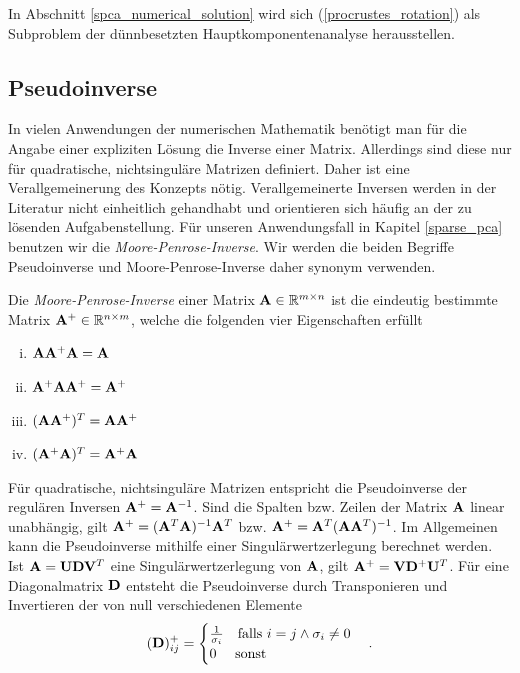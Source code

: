 In Abschnitt \ref{spca_numerical_solution} wird sich (\ref{procrustes_rotation}) als Subproblem der dünnbesetzten Hauptkomponentenanalyse herausstellen.

\subsection{Pseudoinverse}

In vielen Anwendungen der numerischen Mathematik benötigt man für die Angabe einer expliziten Lösung die Inverse einer Matrix. Allerdings sind diese nur für quadratische, nichtsinguläre Matrizen definiert. Daher ist eine Verallgemeinerung des Konzepts nötig. Verallgemeinerte Inversen werden in der Literatur nicht einheitlich gehandhabt und orientieren sich häufig an der zu lösenden Aufgabenstellung. Für unseren Anwendungsfall in Kapitel \ref{sparse_pca} benutzen wir die \textit{Moore-Penrose-Inverse}. Wir werden die beiden Begriffe Pseudoinverse und Moore-Penrose-Inverse daher synonym verwenden.

\begin{defn}
Die \textit{Moore-Penrose-Inverse} einer Matrix $\mathbf{A} \in \mathbb{R}^{m \times n}$ ist die eindeutig bestimmte Matrix $\mathbf{A}^+ \in \mathbb{R}^{n \times m}$, welche die folgenden vier Eigenschaften erfüllt
\begin{enumerate}[(i)]
\item $\mathbf{A} \mathbf{A}^+ \mathbf{A} = \mathbf{A}$
\item $\mathbf{A}^+ \mathbf{A} \mathbf{A}^+ = \mathbf{A}^+$
\item $(\mathbf{A} \mathbf{A}^+)^T = \mathbf{A} \mathbf{A}^+$
\item $(\mathbf{A}^+ \mathbf{A})^T = \mathbf{A}^+ \mathbf{A}$
\end{enumerate}
\end{defn}

Für quadratische, nichtsinguläre Matrizen entspricht die Pseudoinverse der regulären Inversen $\mathbf{A}^+ = \mathbf{A}^{-1}$. Sind die Spalten bzw. Zeilen der Matrix $\mathbf{A}$ linear unabhängig, gilt $\mathbf{A}^{+} = (\mathbf{A}^T \mathbf{A})^{-1} \mathbf{A}^T$ bzw. $\mathbf{A}^{+} = \mathbf{A}^T (\mathbf{A} \mathbf{A}^T)^{-1}$. Im Allgemeinen kann die Pseudoinverse mithilfe einer Singulärwertzerlegung berechnet werden. Ist $\mathbf{A} = \mathbf{U} \mathbf{D} \mathbf{V}^T$ eine Singulärwertzerlegung von $\mathbf{A}$, gilt $\mathbf{A}^+ = \mathbf{V} \mathbf{D}^+ \mathbf{U}^T$. Für eine Diagonalmatrix $\mathbf{D}$ entsteht die Pseudoinverse durch Transponieren und Invertieren der von null verschiedenen Elemente
$$(\mathbf{D})_{ij}^{+} = \begin{cases} \frac{1}{\sigma_{i}} \quad \text{falls } i = j \wedge \sigma _{i} \neq 0\\ 0 \quad \text{ sonst}\end{cases}.$$


